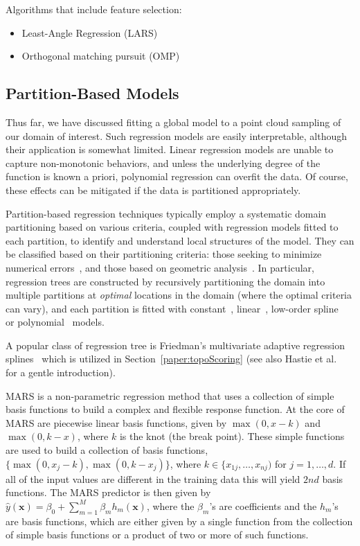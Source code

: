 Algorithms that include feature selection:
\begin{itemize}
\item Least-Angle Regression (LARS)~\cite{EfronHastieJohnstone2004}
\item Orthogonal matching pursuit (OMP)~\cite{DavisMallatZhang1994,PatiRezaiifarKrishnaprasad1993}
\end{itemize}

\subsection{Partition-Based Models}
Thus far, we have discussed fitting a global model to a point cloud sampling of our domain of interest.
%
Such regression models are easily interpretable, although their application is somewhat limited.
%
Linear regression models are unable to capture non-monotonic behaviors, and unless the underlying degree of the function is known a priori, polynomial regression can overfit the data.
%
Of course, these effects can be mitigated if the data is partitioned appropriately.

Partition-based regression techniques typically employ a systematic domain partitioning based on various criteria, coupled with regression models fitted to each partition, to identify and understand local structures of the model.
%
They can be classified based on their partitioning criteria: those seeking to minimize numerical errors~\cite{Friedman1991,AlexanderGrimshaw1996,BreimanFriedmanOlshen1984a,ChaudhuriHuangLoh1994,ChipmanMcCulloch2010}, and those based on geometric analysis~\cite{GerberPotter2012,GerberRubelBremer2011,LiLueChen2000}.
%
In particular, regression trees are constructed by recursively partitioning the domain into multiple partitions at \emph{optimal} locations in the domain (where the optimal criteria can vary), and each partition is fitted with constant~\cite{BreimanFriedmanOlshen1984a}, linear~\cite{AlexanderGrimshaw1996,LiLueChen2000}, low-order spline~\cite{Friedman1991} or polynomial~\cite{ChaudhuriHuangLoh1994} models.

A popular class of regression tree is Friedman's multivariate adaptive regression splines~\cite{Friedman1991} which is utilized in Section~\ref{paper:topoScoring} (see also Hastie et al.~\cite{HastieTibshiraniFriedman2008} for a gentle introduction).

MARS is a non-parametric regression method that uses a collection of simple basis functions to build a complex and flexible response function.
%
At the core of MARS are piecewise linear basis functions, given by $\max(0, x - k)$ and $\max(0, k - x)$, where $k$ is the knot (the break point).
%
These simple functions are used to build a collection of basis functions, $\{\max(0, x_j-k), \max(0,k-x_j)\}$, where $k \in \{x_{1j}, \dots, x_{nj})$ for $j = 1, \dots, d$.
%
If all of the input values are different in the training data this will yield $2nd$ basis functions. The MARS predictor is then given by $\hat{y}(\mathbf{x}) = \beta_0 + \sum_{m=1}^M \beta_m h_m(\mathbf{x})$, where the $\beta_m$'s are coefficients and the $h_m$'s are basis functions, which are either given by a single function from the collection of simple basis functions or a product of
two or more of such functions.

